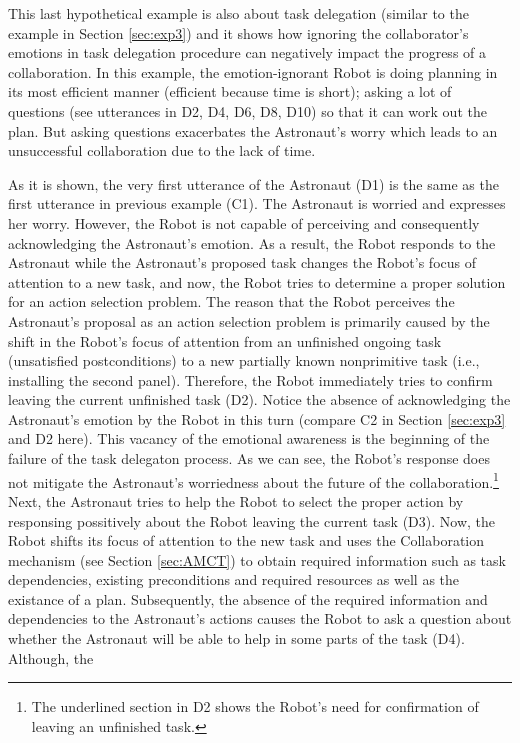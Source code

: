 This last hypothetical example is also about task delegation (similar to the
example in Section \ref{sec:exp3}) and it shows how ignoring the collaborator's
emotions in task delegation procedure can negatively impact the progress of a
collaboration. In this example, the emotion-ignorant Robot is doing planning in
its most efficient manner (efficient because time is short); asking a lot of
questions (see utterances in D2, D4, D6, D8, D10) so that it can work out the
plan. But asking questions exacerbates the Astronaut's worry which leads to an
unsuccessful collaboration due to the lack of time. 

As it is shown, the very first utterance of the Astronaut (D1) is the same as
the first utterance in previous example (C1). The Astronaut is worried and
expresses her worry. However, the Robot is not capable of perceiving and
consequently acknowledging the Astronaut's emotion. As a result, the Robot
responds to the Astronaut while the Astronaut's proposed task changes the
Robot's focus of attention to a new task, and now, the Robot tries to determine
a proper solution for an action selection problem. The reason that the Robot
perceives the Astronaut's proposal as an action selection problem is primarily
caused by the shift in the Robot's focus of attention from an unfinished ongoing
task (unsatisfied postconditions) to a new partially known nonprimitive task
(i.e., installing the second panel). Therefore, the Robot immediately tries to
confirm leaving the current unfinished task (D2). Notice the absence of
acknowledging the Astronaut's emotion by the Robot in this turn (compare C2 in
Section \ref{sec:exp3} and D2 here). This vacancy of the emotional awareness is
the beginning of the failure of the task delegaton process. As we can see, the
Robot's response does not mitigate the Astronaut's worriedness about the future
of the collaboration.\footnote{The underlined section in D2 shows the Robot's
need for confirmation of leaving an unfinished task.} Next, the Astronaut tries
to help the Robot to select the proper action by responsing possitively about
the Robot leaving the current task (D3). Now, the Robot shifts its focus of
attention to the new task and uses the Collaboration mechanism (see Section
\ref{sec:AMCT}) to obtain required information such as task dependencies,
existing preconditions and required resources as well as the existance of a
plan. Subsequently, the absence of the required information and dependencies to
the Astronaut's actions causes the Robot to ask a question about whether the
Astronaut will be able to help in some parts of the task (D4). Although, the
